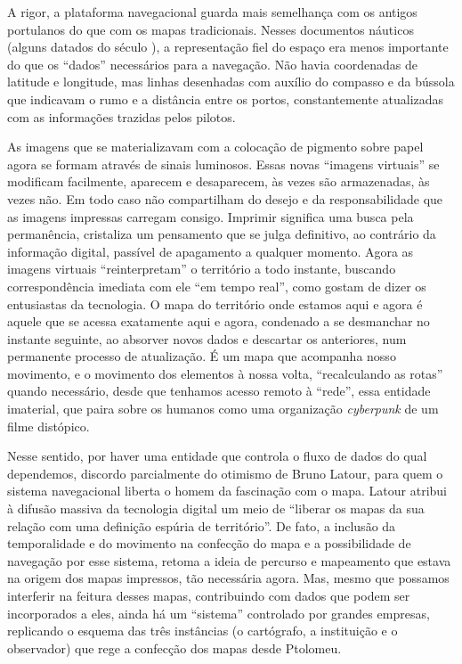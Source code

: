 A rigor, a plataforma navegacional guarda mais semelhança com os antigos
portulanos do que com os mapas tradicionais. Nesses documentos náuticos
(alguns datados do século ), a representação fiel do espaço era
menos importante do que os ``dados'' necessários para a navegação. Não
havia coordenadas de latitude e longitude, mas linhas desenhadas com
auxílio do compasso e da bússola que indicavam o rumo e a distância
entre os portos, constantemente atualizadas com as informações trazidas
pelos pilotos.

As imagens que se materializavam com a colocação de pigmento sobre papel
agora se formam através de sinais luminosos. Essas novas ``imagens
virtuais'' se modificam facilmente, aparecem e desaparecem, às vezes são
armazenadas, às vezes não. Em todo caso não compartilham do desejo e da
responsabilidade que as imagens impressas carregam consigo. Imprimir
significa uma busca pela permanência, cristaliza um pensamento que se
julga definitivo, ao contrário da informação digital, passível de
apagamento a qualquer momento. Agora as imagens virtuais
``reinterpretam'' o território a todo instante, buscando correspondência
imediata com ele ``em tempo real'', como gostam de dizer os entusiastas
da tecnologia. O mapa do território onde estamos aqui e agora é aquele
que se acessa exatamente aqui e agora, condenado a se desmanchar no
instante seguinte, ao absorver novos dados e descartar os anteriores,
num permanente processo de atualização. É um mapa que acompanha nosso
movimento, e o movimento dos elementos à nossa volta, ``recalculando as
rotas'' quando necessário, desde que tenhamos acesso remoto à ``rede'',
essa entidade imaterial, que paira sobre os humanos como uma organização
\emph{cyberpunk} de um filme distópico.

Nesse sentido, por haver uma entidade que controla o fluxo de dados do
qual dependemos, discordo parcialmente do otimismo de Bruno Latour, para
quem o sistema navegacional liberta o homem da fascinação com o mapa.
Latour atribui à difusão massiva da tecnologia digital um meio de
``liberar os mapas da sua relação com uma definição espúria de
território''. De fato, a inclusão da temporalidade e do movimento na
confecção do mapa e a possibilidade de navegação por esse sistema,
retoma a ideia de percurso e mapeamento que estava na origem dos mapas
impressos, tão necessária agora. Mas, mesmo que possamos interferir na
feitura desses mapas, contribuindo com dados que podem ser incorporados
a eles, ainda há um ``sistema'' controlado por grandes empresas,
replicando o esquema das três instâncias (o cartógrafo, a instituição e
o observador) que rege a confecção dos mapas desde Ptolomeu.

